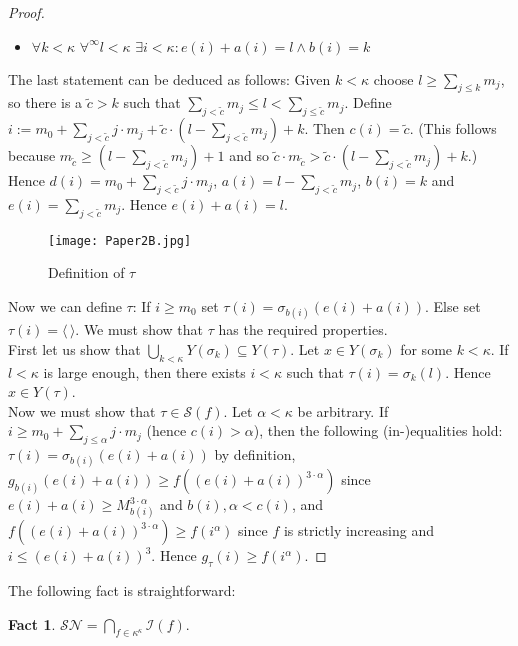 \documentclass[12pt,a4paper]{scrartcl}
\theoremstyle{definition}
\newtheorem{fact}[definition]{Fact}
\numberwithin{equation}{section}
\begin{document}
\begin{proof}
\begin{itemize}
\item $\forall k <\kappa \,\, \forall^{\infty} l < \kappa \,\, \exists i < \kappa \colon e(i) + a(i)=l \land b(i)=k$
\end{itemize}
The last statement can be deduced as follows: Given $k < \kappa$ choose $l \geq \sum_{j \leq k}  m_j$, so there is a $\tilde{c}>k$ such that $\sum_{j < \tilde{c}}  m_j \leq l <\sum_{j \leq \tilde{c}}  m_j$. Define $i:= m_0+ \sum_{j < \tilde{c}} j \cdot m_j + \tilde{c} \cdot (l - \sum_{j < \tilde{c}}  m_j) + k $. Then $c(i)=\tilde{c}$. (This follows because $m_{\tilde{c}} \geq (l - \sum_{j < \tilde{c}}  m_j) +1$ and so $\tilde{c} \cdot m_{\tilde{c}} > \tilde{c} \cdot (l - \sum_{j < \tilde{c}}  m_j) +k$.) Hence $d(i) = m_0+ \sum_{j < \tilde{c}} j \cdot m_j$, $a(i)= l - \sum_{j < \tilde{c}}  m_j$, $b(i)=k$ and $e(i)= \sum_{j < \tilde{c}}  m_j$. Hence $e(i) + a(i)=l$.

\begin{figure}[h]
 \centering
 \texttt{[image: Paper2B.jpg]}
 \caption{Definition of $\tau$}
 \label{Figure 1}
\end{figure}

Now we can define $\tau$: If $i\geq m_0$ set $\tau (i) = \sigma_{b(i)} (e(i)+ a(i))$. Else set $\tau (i)= \langle \, \rangle$. We must show that $\tau$ has the required properties.\\
First let us show that $\bigcup_{k < \kappa} Y(\sigma_k) \subseteq Y(\tau)$.  Let $x \in Y(\sigma_k)$ for some $k< \kappa$. If $l < \kappa$ is large enough, then there exists $i < \kappa$ such that $\tau (i) = \sigma_k (l)$. Hence $x \in Y(\tau)$.\\
Now we must show that $\tau \in \mathcal{S}(f)$. Let $\alpha < \kappa$ be arbitrary. If $i \geq m_0+\sum_{j \leq \alpha} j \cdot m_j$ (hence $c(i)> \alpha$), then the following (in-)equalities hold: $\tau (i) = \sigma_{b(i)}(e(i)+a(i))$ by definition, $g_{b(i)}(e(i)+a(i)) \geq f((e(i)+a(i))^{3 \cdot \alpha})$ since $e(i)+a(i) \geq M_{b(i)}^{3 \cdot \alpha}$ and $b(i), \alpha < c(i)$, and $f((e(i)+a(i))^{3 \cdot \alpha}) \geq f(i^\alpha)$ since $f$ is strictly increasing and $i \leq (e(i)+a(i))^3 $. Hence $g_{\tau} (i) \geq f(i^\alpha)$.
\end{proof}

The following fact is straightforward:

\begin{fact}
$\mathcal{SN} = \bigcap_{f \in \kappa^\kappa} \mathcal{I}(f)$.
\end{fact}
\end{document}
